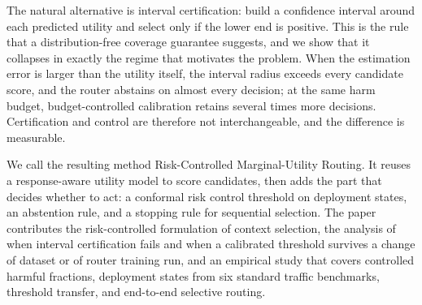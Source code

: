 The natural alternative is interval certification: build a confidence interval
around each predicted utility and select only if the lower end is positive.
This is the rule that a distribution-free coverage guarantee suggests, and we
show that it collapses in exactly the regime that motivates the problem. When
the estimation error is larger than the utility itself, the interval radius
exceeds every candidate score, and the router abstains on almost every
decision; at the same harm budget, budget-controlled calibration retains
several times more decisions. Certification and control are therefore not
interchangeable, and the difference is measurable.

We call the resulting method Risk-Controlled Marginal-Utility Routing. It
reuses a response-aware utility model to score candidates, then adds the part
that decides whether to act: a conformal risk control threshold on deployment
states, an abstention rule, and a stopping rule for sequential selection. The
paper contributes the risk-controlled formulation of context selection, the
analysis of when interval certification fails and when a calibrated threshold
survives a change of dataset or of router training run, and an empirical study
that covers controlled harmful fractions, deployment states from six standard
traffic benchmarks, threshold transfer, and end-to-end selective routing.
